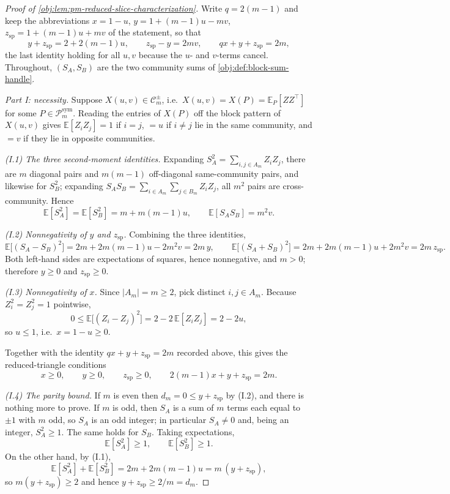 \begin{proof}[Proof of \cref{obj:lem:pm-reduced-slice-characterization}]
Write \(q=2(m-1)\) and keep the abbreviations \(x=1-u\), \(y=1+(m-1)u-mv\), \(z_{\mathrm{sp}}=1+(m-1)u+mv\) of the statement, so that
\[
y+z_{\mathrm{sp}}=2+2(m-1)u,
\qquad
z_{\mathrm{sp}}-y=2mv,
\qquad
qx+y+z_{\mathrm{sp}}=2m ,
\]
the last identity holding for all \(u,v\) because the \(u\)- and \(v\)-terms cancel.  Throughout, \((S_A,S_B)\) are the two community sums of \cref{obj:def:block-sum-handle}.


\emph{Part I: necessity.}  Suppose \(X(u,v)\in\mathcal C_m^{\pm}\), i.e.\ \(X(u,v)=X(P)=\mathbb E_P[ZZ^\top]\) for some \(P\in\mathcal P_m^{\mathrm{sym}}\).  Reading the entries of \(X(P)\) off the block pattern of \(X(u,v)\) gives \(\mathbb E[Z_iZ_j]=1\) if \(i=j\), \(=u\) if \(i\ne j\) lie in the same community, and \(=v\) if they lie in opposite communities.

\emph{(I.1) The three second-moment identities.}  Expanding \(S_A^2=\sum_{i,j\in A_m}Z_iZ_j\), there are \(m\) diagonal pairs and \(m(m-1)\) off-diagonal same-community pairs, and likewise for \(S_B^2\); expanding \(S_AS_B=\sum_{i\in A_m}\sum_{j\in B_m}Z_iZ_j\), all \(m^2\) pairs are cross-community.  Hence
\[
\mathbb E[S_A^2]=\mathbb E[S_B^2]=m+m(m-1)u,
\qquad
\mathbb E[S_AS_B]=m^2v .
\]

\emph{(I.2) Nonnegativity of \(y\) and \(z_{\mathrm{sp}}\).}  Combining the three identities,
\[
\mathbb E\bigl[(S_A-S_B)^2\bigr]
=2m+2m(m-1)u-2m^2v
=2m\,y,
\qquad
\mathbb E\bigl[(S_A+S_B)^2\bigr]
=2m+2m(m-1)u+2m^2v
=2m\,z_{\mathrm{sp}} .
\]
Both left-hand sides are expectations of squares, hence nonnegative, and \(m>0\); therefore \(y\ge0\) and \(z_{\mathrm{sp}}\ge0\). %

\emph{(I.3) Nonnegativity of \(x\).}  Since \(|A_m|=m\ge2\), pick distinct \(i,j\in A_m\).  Because \(Z_i^2=Z_j^2=1\) pointwise,
\[
0\le\mathbb E\bigl[(Z_i-Z_j)^2\bigr]=2-2\,\mathbb E[Z_iZ_j]=2-2u,
\]
so \(u\le1\), i.e.\ \(x=1-u\ge0\). %

Together with the identity \(qx+y+z_{\mathrm{sp}}=2m\) recorded above, this gives the reduced-triangle conditions
\[
x\ge0,\qquad y\ge0,\qquad z_{\mathrm{sp}}\ge0,\qquad
2(m-1)x+y+z_{\mathrm{sp}}=2m .
\]

\emph{(I.4) The parity bound.}  If \(m\) is even then \(d_m=0\le y+z_{\mathrm{sp}}\) by (I.2), and there is nothing more to prove.  If \(m\) is odd, then \(S_A\) is a sum of \(m\) terms each equal to \(\pm1\) with \(m\) odd, so \(S_A\) is an odd integer; in particular \(S_A\ne0\) and, being an integer, \(S_A^2\ge1\).  The same holds for \(S_B\).  Taking expectations,
\[
\mathbb E[S_A^2]\ge1,
\qquad
\mathbb E[S_B^2]\ge1 .
\]
On the other hand, by (I.1),
\[
\mathbb E[S_A^2]+\mathbb E[S_B^2]=2m+2m(m-1)u=m\,(y+z_{\mathrm{sp}}),
\]
so \(m(y+z_{\mathrm{sp}})\ge2\) and hence \(y+z_{\mathrm{sp}}\ge 2/m=d_m\). %



\end{proof}
